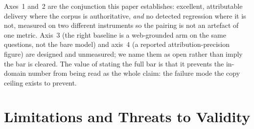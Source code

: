 \documentclass[10pt,twocolumn]{article}
\begin{document}
Axes~1 and~2 are the conjunction this paper establishes: excellent, attributable delivery where the
corpus is authoritative, \emph{and} no detected regression where it is not, measured on two different
instruments so the pairing is not an artefact of one metric. Axis~3 (the right baseline is a
web-grounded arm on the same questions, not the bare model) and axis~4 (a reported attribution-precision
figure) are designed and unmeasured; we name them as open rather than imply the bar is cleared. The
value of stating the full bar is that it prevents the in-domain number from being read as the whole
claim: the failure mode the copy ceiling exists to prevent.

\section{Limitations and Threats to Validity}\label{sec:limits}
\end{document}
